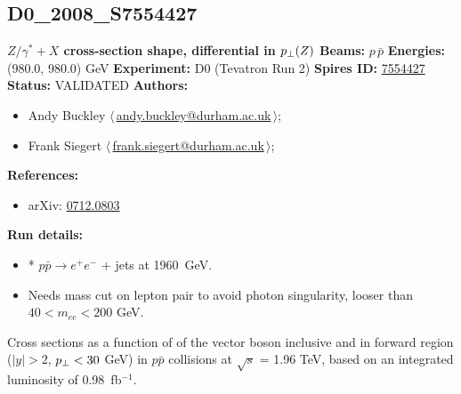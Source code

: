 \subsection[D0\_2008\_S7554427]{D0\_2008\_S7554427\,\cite{:2007nt}}
\textbf{$Z/\gamma^* + X$ cross-section shape, differential in $p_\perp(Z)$}\newline
\textbf{Beams:} $p$\,$\bar{p}$ \newline
\textbf{Energies:} (980.0, 980.0) GeV \newline
\textbf{Experiment:} D0 (Tevatron Run 2) \newline
\textbf{Spires ID:} \href{http://www.slac.stanford.edu/spires/find/hep/www?rawcmd=key+7554427}{7554427}\newline
\textbf{Status:} VALIDATED\newline
\textbf{Authors:}
\begin{itemize}
  \item Andy Buckley $\langle\,$\href{mailto:andy.buckley@durham.ac.uk}{andy.buckley@durham.ac.uk}$\,\rangle$;
  \item Frank Siegert $\langle\,$\href{mailto:frank.siegert@durham.ac.uk}{frank.siegert@durham.ac.uk}$\,\rangle$;
\end{itemize}
\textbf{References:}
\begin{itemize}
  \item arXiv: \href{http://arxiv.org/abs/0712.0803}{0712.0803}
\end{itemize}
\textbf{Run details:}
\begin{itemize}

  \item * $p \bar{p} \to e^+ e^-$ + jets at 1960~GeV.
  \item Needs mass cut on lepton pair to avoid photon singularity, looser than $40 < m_{ee} < 200$ GeV.\end{itemize}

\noindent Cross sections as a function of \pT of the vector boson inclusive and in forward region ($|y| > 2$, $p_\perp<30$ GeV) in $p \bar{p}$ collisions at $\sqrt{s}$ = 1.96 TeV, based on an integrated luminosity of 0.98~fb$^{-1}$.

\clearpage


\clearpage

